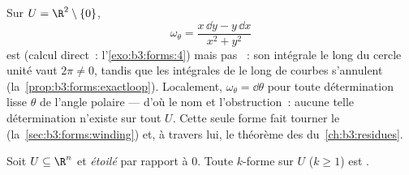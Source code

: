 \begin{example}\label{ex:b3:forms:angular}
Sur $U = \R^2 \setminus \{0\}$,
\[
\omega_\theta = \frac{x\,\dd y - y\,\dd x}{x^2 + y^2}
\]
est  (calcul direct~: l'\cref{exo:b3:forms:4}) mais
pas ~: son intégrale le long du cercle unité vaut $2\pi
\neq 0$, tandis que les intégrales de  le long
de courbes  s'annulent
(la~\cref{prop:b3:forms:exactloop}). Localement, $\omega_\theta
= \dd\theta$ pour toute détermination lisse $\theta$ de
l'angle polaire --- d'où le nom et l'obstruction~: aucune
telle détermination n'existe sur tout $U$. Cette seule forme
fait tourner le 
(la~\cref{sec:b3:forms:winding}) et, à travers lui, le théorème
des  du~\cref{ch:b3:residues}.
\end{example}

\begin{theorem}\label{thm:b3:forms:poincare}
Soit $U \subseteq \R^n$  et \emph{étoilé} par rapport
à $0$. Toute $k$-forme  sur $U$ ($k \geq 1$) est
.
\end{theorem}

